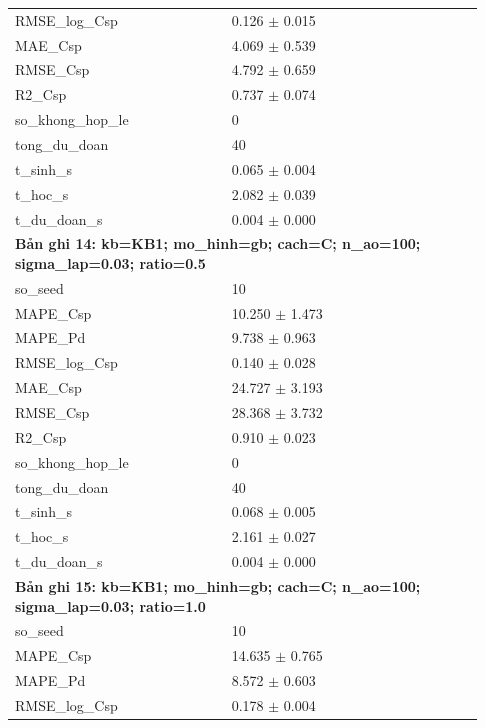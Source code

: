 \begin{longtable}{p{0.43\linewidth}p{0.50\linewidth}}
RMSE\_\allowbreak log\_\allowbreak Csp & 0.126 $\pm$ 0.015 \\
MAE\_\allowbreak Csp & 4.069 $\pm$ 0.539 \\
RMSE\_\allowbreak Csp & 4.792 $\pm$ 0.659 \\
R2\_\allowbreak Csp & 0.737 $\pm$ 0.074 \\
so\_\allowbreak khong\_\allowbreak hop\_\allowbreak le & 0 \\
tong\_\allowbreak du\_\allowbreak doan & 40 \\
t\_\allowbreak sinh\_\allowbreak s & 0.065 $\pm$ 0.004 \\
t\_\allowbreak hoc\_\allowbreak s & 2.082 $\pm$ 0.039 \\
t\_\allowbreak du\_\allowbreak doan\_\allowbreak s & 0.004 $\pm$ 0.000 \\
\midrule
\multicolumn{2}{p{0.95\linewidth}}{\textbf{Bản ghi 14: kb=KB1; mo\_hinh=gb; cach=C; n\_ao=100; sigma\_lap=0.03; ratio=0.5}} \\
so\_\allowbreak seed & 10 \\
MAPE\_\allowbreak Csp & 10.250 $\pm$ 1.473 \\
MAPE\_\allowbreak Pd & 9.738 $\pm$ 0.963 \\
RMSE\_\allowbreak log\_\allowbreak Csp & 0.140 $\pm$ 0.028 \\
MAE\_\allowbreak Csp & 24.727 $\pm$ 3.193 \\
RMSE\_\allowbreak Csp & 28.368 $\pm$ 3.732 \\
R2\_\allowbreak Csp & 0.910 $\pm$ 0.023 \\
so\_\allowbreak khong\_\allowbreak hop\_\allowbreak le & 0 \\
tong\_\allowbreak du\_\allowbreak doan & 40 \\
t\_\allowbreak sinh\_\allowbreak s & 0.068 $\pm$ 0.005 \\
t\_\allowbreak hoc\_\allowbreak s & 2.161 $\pm$ 0.027 \\
t\_\allowbreak du\_\allowbreak doan\_\allowbreak s & 0.004 $\pm$ 0.000 \\
\midrule
\multicolumn{2}{p{0.95\linewidth}}{\textbf{Bản ghi 15: kb=KB1; mo\_hinh=gb; cach=C; n\_ao=100; sigma\_lap=0.03; ratio=1.0}} \\
so\_\allowbreak seed & 10 \\
MAPE\_\allowbreak Csp & 14.635 $\pm$ 0.765 \\
MAPE\_\allowbreak Pd & 8.572 $\pm$ 0.603 \\
RMSE\_\allowbreak log\_\allowbreak Csp & 0.178 $\pm$ 0.004 \\

\end{longtable}

